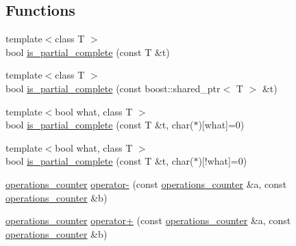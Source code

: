 \subsection*{Functions}
\begin{DoxyCompactItemize}
\item 
{\footnotesize template$<$class T $>$ }\\bool \hyperlink{group__generic__api_ga1f174dc461330b794c554960156ccd8f}{is\-\_\-partial\-\_\-complete} (const T \&t)
\item 
{\footnotesize template$<$class T $>$ }\\bool \hyperlink{group__generic__api_ga34033f038598eb0310780c63fdf0ab55}{is\-\_\-partial\-\_\-complete} (const boost\-::shared\-\_\-ptr$<$ T $>$ \&t)
\begin{DoxyCompactList}\small\item\em \end{DoxyCompactList}\item 
{\footnotesize template$<$bool what, class T $>$ }\\bool \hyperlink{group__generic__api_ga50c2d14a04778fbb6c4bf53fe5cdfac1}{is\-\_\-partial\-\_\-complete} (const T \&t, char($\ast$)\mbox{[}what\mbox{]}=0)
\begin{DoxyCompactList}\small\item\em \end{DoxyCompactList}\item 
{\footnotesize template$<$bool what, class T $>$ }\\bool \hyperlink{group__generic__api_ga736c9a71c804eb6f190208a808a7ff47}{is\-\_\-partial\-\_\-complete} (const T \&t, char($\ast$)\mbox{[}!what\mbox{]}=0)
\begin{DoxyCompactList}\small\item\em \end{DoxyCompactList}\item 
\hyperlink{structkodo_1_1operations__counter}{operations\-\_\-counter} \hyperlink{namespacekodo_a1f29521fbf5adf9e1a4b9a7889018ec0}{operator-\/} (const \hyperlink{structkodo_1_1operations__counter}{operations\-\_\-counter} \&a, const \hyperlink{structkodo_1_1operations__counter}{operations\-\_\-counter} \&b)
\item 
\hyperlink{structkodo_1_1operations__counter}{operations\-\_\-counter} \hyperlink{namespacekodo_a884238f1ed3b2147a61d90dcfa56d955}{operator+} (const \hyperlink{structkodo_1_1operations__counter}{operations\-\_\-counter} \&a, const \hyperlink{structkodo_1_1operations__counter}{operations\-\_\-counter} \&b)

\end{DoxyCompactItemize}
